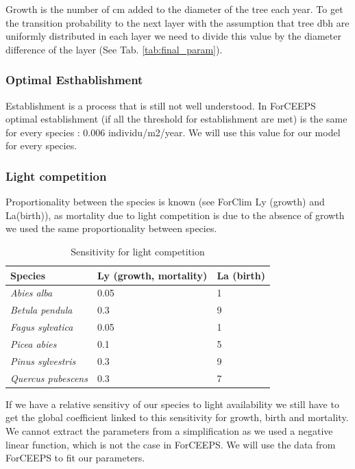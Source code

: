 \documentclass{article}
\begin{document}
Growth is the number of cm added to the diameter of the tree each year. To get the transition probability to the next layer with the assumption that tree dbh are uniformly distributed in each layer we need to divide this value by the diameter difference of the layer (See Tab. \ref{tab:final_param}).

\subsubsection{Optimal Esthablishment}

Establishment is a process that is still not well understood. In ForCEEPS optimal establishment (if all the threshold for establishment are met) is the same for every species : 0.006 individu/m2/year. We will use this value for our model for every species.

\subsubsection {Light competition}

Proportionality between the species is known (see ForClim Ly (growth) and La(birth)), as mortality due to light competition is due to the absence of growth we used the same proportionality between species.

\begin{table}[H]
\begin{center}
    \begin{tabular}{lll}
    \hline
    Species & Ly (growth, mortality) & La (birth) \\ \hline
    \textit{Abies alba} & 0.05 & 1 \\
    \textit{Betula pendula} & 0.3 & 9 \\
    \textit{Fagus sylvatica} & 0.05 & 1 \\
    \textit{Picea abies} & 0.1 & 5 \\
    \textit{Pinus sylvestris} & 0.3 & 9 \\
    \textit{Quercus pubescens} & 0.3 & 7 \\ \hline
    \end{tabular}
    \caption{Sensitivity for light competition}
    \label{tab:prop_sensitivity}
\end{center}
\end{table}

If we have a relative sensitivy of our species to light availability we still have to get the global coefficient linked to this sensitivity for growth, birth and mortality. We cannot extract the parameters from a simplification as we used a negative linear function, which is not the case in ForCEEPS. We will use the data from ForCEEPS to fit our parameters.
\end{document}
